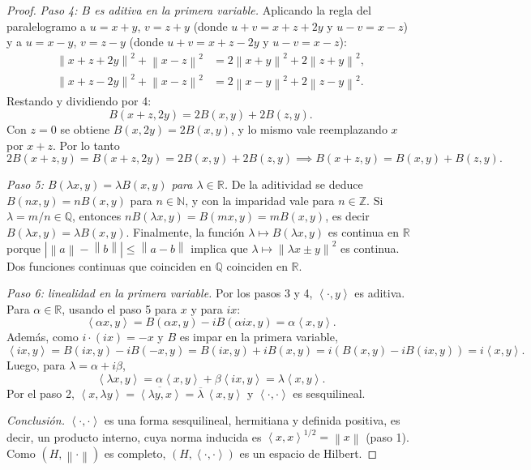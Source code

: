 \documentclass{article}
\theoremstyle{definition}
\newcommand{\R}{\mathbb{R}}
\newcommand{\Z}{\mathbb{Z}}
\newcommand{\N}{\mathbb{N}}
\newcommand{\Q}{\mathbb{Q}}
\newcommand{\norm}[1]{\left\lVert #1 \right\rVert}       %
\newcommand{\ip}[2]{\left\langle #1, #2 \right\rangle}   %
\begin{document}
\begin{proof}
	\emph{Paso 4: \( B \) es aditiva en la primera variable.} Aplicando la regla del paralelogramo a \( u = x + y \), \( v = z + y \) (donde \( u + v = x + z + 2y \) y \( u - v = x - z \)) y a \( u = x - y \), \( v = z - y \) (donde \( u + v = x + z - 2y \) y \( u - v = x - z \)):
	\begin{align*}
		\norm{x+z+2y}^2 + \norm{x-z}^2 & = 2\norm{x+y}^2 + 2\norm{z+y}^2, \\
		\norm{x+z-2y}^2 + \norm{x-z}^2 & = 2\norm{x-y}^2 + 2\norm{z-y}^2.
	\end{align*}
	Restando y dividiendo por 4:
	\[ B(x+z, 2y) = 2B(x, y) + 2B(z, y). \]
	Con \( z = 0 \) se obtiene \( B(x, 2y) = 2B(x, y) \), y lo mismo vale reemplazando \( x \) por \( x + z \). Por lo tanto
	\[ 2B(x+z, y) = B(x+z, 2y) = 2B(x, y) + 2B(z, y) \implies B(x+z, y) = B(x, y) + B(z, y). \]

	\emph{Paso 5: \( B(\lambda x, y) = \lambda B(x, y) \) para \( \lambda \in \R \).} De la aditividad se deduce \( B(nx, y) = nB(x, y) \) para \( n \in \N \), y con la imparidad vale para \( n \in \Z \). Si \( \lambda = m/n \in \Q \), entonces \( nB(\lambda x, y) = B(mx, y) = mB(x, y) \), es decir \( B(\lambda x, y) = \lambda B(x, y) \). Finalmente, la función \( \lambda \mapsto B(\lambda x, y) \) es continua en \( \R \) porque \( |\norm{a} - \norm{b}| \le \norm{a - b} \) implica que \( \lambda \mapsto \norm{\lambda x \pm y}^2 \) es continua. Dos funciones continuas que coinciden en \( \Q \) coinciden en \( \R \).

	\emph{Paso 6: linealidad en la primera variable.} Por los pasos 3 y 4, \( \ip{\cdot}{y} \) es aditiva. Para \( \alpha \in \R \), usando el paso 5 para \( x \) y para \( ix \):
	\[ \ip{\alpha x}{y} = B(\alpha x, y) - iB(\alpha ix, y) = \alpha \ip{x}{y}. \]
	Además, como \( i \cdot (ix) = -x \) y \( B \) es impar en la primera variable,
	\[ \ip{ix}{y} = B(ix, y) - iB(-x, y) = B(ix, y) + iB(x, y) = i\left( B(x, y) - iB(ix, y) \right) = i\ip{x}{y}. \]
	Luego, para \( \lambda = \alpha + i\beta \),
	\[ \ip{\lambda x}{y} = \alpha\ip{x}{y} + \beta\ip{ix}{y} = \lambda \ip{x}{y}. \]
	Por el paso 2, \( \ip{x}{\lambda y} = \overline{\ip{\lambda y}{x}} = \overline{\lambda}\,\ip{x}{y} \) y \( \ip{\cdot}{\cdot} \) es sesquilineal.

	\emph{Conclusión.} \( \ip{\cdot}{\cdot} \) es una forma sesquilineal, hermitiana y definida positiva, es decir, un producto interno, cuya norma inducida es \( \ip{x}{x}^{1/2} = \norm{x} \) (paso 1). Como \( (H, \norm{\cdot}) \) es completo, \( (H, \ip{\cdot}{\cdot}) \) es un espacio de Hilbert.
\end{proof}
\end{document}
